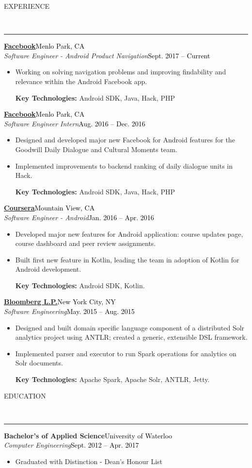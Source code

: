 \documentclass[11pt, letterpaper, oneside]{article}
\newcommand{\HRule}[2]{\textcolor{#1}{\rule{\linewidth}{#2}}}
\newcommand{\sectiontitle}[1]{\begin{minipage}{\textwidth}\vspace{-7.5pt}\begin{flushleft}\hspace{-20.5pt}\vspace{-25pt}
\Large\MakeUppercase{#1}\end{flushleft}\end{minipage}\\\HRule{black}{0.15mm}\vspace{\baselineskip}}
\newenvironment{ressection}[1]{
  \sectiontitle{#1}}
  {\vspace{-\baselineskip}}
\newcommand{\resentryheader}[4]{
    \vspace{-6pt}
    \textbf{#1}\hspace{\stretch{1}}\textcolor{black}{#3}\\
    \textit{#2}\hspace{\stretch{1}}\textcolor{black}{#4}\\
}
\newcommand{\resitem}[1]{
    \vspace{2pt}
    \item \begin{flushleft} #1 \end{flushleft}
}
\newenvironment{resentry}[4]{
  \begin{minipage}{\textwidth}
  \vspace{-3pt}
    \resentryheader{#1}{#2}{#3}{#4}
        \vspace{-\baselineskip}
    \begin{itemize}[noitemsep,nolistsep]
}{
    \end{itemize}
        \vspace{\baselineskip}
        \end{minipage}
}
\begin{document}
\begin{ressection}{Experience}
  \begin{resentry}{\href{https://www.facebook.com/Engineering/}{Facebook}}{Software Engineer - Android Product Navigation}{Menlo Park, CA}{Sept. 2017 -- Current}
   \resitem{Working on solving navigation problems and improving findability and relevance within the Android Facebook app. }
    \vspace{3pt}  \hspace{-15pt}
    \textbf{Key Technologies:} Android SDK, Java, Hack, PHP
	\vspace{6pt}   
  \end{resentry}  
  \begin{resentry}{\href{https://www.facebook.com/Engineering/}{Facebook}}{Software Engineer Intern}{Menlo Park, CA}{Aug. 2016 -- Dec. 2016}
   \resitem{Designed and developed major new Facebook for Android features for the Goodwill Daily Dialogue and Cultural Moments team. }
    \resitem{Implemented improvements to backend ranking of daily dialogue units in Hack.}
    \vspace{3pt}  \hspace{-15pt}
    \textbf{Key Technologies:} Android SDK, Java, Hack, PHP
	\vspace{6pt}   
  \end{resentry}  
 \begin{resentry}{\href{https://www.coursera.org/}{Coursera}}{Software Engineer - Android}{Mountain View, CA}{Jan. 2016 -- Apr. 2016}
    \resitem{Developed major new features for Android application: course updates page, course dashboard and peer review assignments.}
    \resitem{Built first new feature in Kotlin, leading the team in adoption of Kotlin for Android development.}
    \vspace{3pt} \hspace{-15pt}
    \textbf{Key Technologies:} Android SDK, Kotlin.
    \vspace{6pt} 
  \end{resentry}  
  \begin{resentry}{\href{http://www.bloomberg.com/professional/}{Bloomberg L.P.}}{Software Engineering}{New York City, NY}{May. 2015 -- Aug. 2015}
    \resitem{Designed and built domain specific language component of a distributed Solr analytics project using ANTLR; created a generic, extensible DSL framework.}
    \resitem{Implemented parser and executor to run Spark operations for analytics on Solr documents.}
    \vspace{3pt} \hspace{-15pt}
    \textbf{Key Technologies:} Apache Spark, Apache Solr, ANTLR, Jetty.
    \vspace{6pt} 
  \end{resentry}  
\end{ressection}

\vspace{4pt}

\begin{ressection}{Education}
\begin{resentry}{Bachelor's of Applied Science}{Computer Engineering}{University of Waterloo}{Sept. 2012 -- Apr. 2017}
    \resitem{Graduated with Distinction - Dean's Honour List} \hspace{-15pt}
  \end{resentry}  
\end{ressection}
\end{document}
